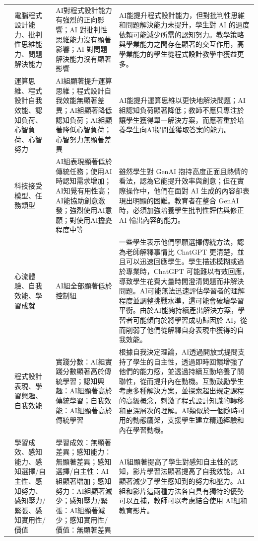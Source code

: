 \begin{longtable}{@{}p{} p{} p{} p{}@{}}
\cite{omeh2025pbl} & 電腦程式設計能力、批判性思維能力、問題解決能力 & AI對程式設計能力有強烈的正向影響；AI 對批判性思維能力沒有顯著影響；AI 對問題解決能力沒有顯著影響 & AI能提升程式設計能力，但對批判性思維和問題解決能力未提升，學生對 AI 的過度依賴可能減少所需的認知努力。教學策略與學業能力之間存在顯著的交互作用，高學業能力的學生從程式設計教學中獲益更多。 \\
\cite{yan2025llm} & 運算思維、程式設計自我效能、認知負荷、心智負荷、心智努力 & AI組顯著提升運算思維；程式設計自我效能無顯著差異；AI組顯著降低認知負荷；AI組顯著降低心智負荷；心智努力無顯著差異 & AI能提升運算思維以更快地解決問題；AI組認知負荷顯著降低；教師不應只專注於讓學生獲得單一解決方案，而應著重於培養學生向AI提問並獲取答案的能力。 \\
\cite{kohen2025integrating} & 科技接受模型、任務類型 & AI組表現顯著低於傳統任務；使用AI時認知需求增加；AI知覺有用性高；AI能協助創意激發；強烈使用AI意願；對使用AI擔憂程度中等 & 雖然學生對 GenAI 抱持高度正面且熱情的看法，認為它能提升效率與創意；但在實際操作中，他們在面對 AI 生成的內容卻表現出明顯的困難。教育者在整合 GenAI 時，必須加強培養學生批判性評估與修正 AI 輸出內容的能力。 \\
\cite{yang2025chatgpt} & 心流體驗、自我效能、學習成就 & AI組全部顯著低於控制組 & 一些學生表示他們寧願選擇傳統方法，認為老師解釋事情比 ChatGPT 更清楚，並且可以迅速回應學生。學生描述模糊或過於專業時，ChatGPT 可能難以有效回應，導致學生花費大量時間澄清問題而非解決問題。AI可能無法迅速評估學習者的理解程度並調整挑戰水準，這可能會破壞學習平衡。由於AI能夠持續產出解決方案，學習者可能傾向於將學習成功歸因於 AI，從而削弱了他們從解釋自身表現中獲得的自我效能。 \\
\cite{tang2025enhancing} & 程式設計表現、學習興趣、自我效能 & 實踐分數：AI組實踐分數顯著高於傳統學習；認知興趣：AI組顯著高於傳統學習；自我效能：AI組顯著高於傳統學習 & 根據自我決定理論，AI透過開放式提問支持了學生的自主性，透過即時回饋增強了他們的能力感，並透過持續互動培養了關聯性，從而提升內在動機。互動鼓勵學生考慮多種解決方案，並探索超出規定課程的高級概念，刺激了程式設計知識的轉移和更深層次的理解。AI類似於一個隨時可用的動態鷹架，支援學生建立精通經驗和內在學習動機。 \\
\cite{cubillos2025generative} & 學習成效、感知能力、感知選擇/自主性、感知努力、感知壓力/緊張、感知實用性/價值 & 學習成效：無顯著差異；感知能力：無顯著差異；感知選擇/自主性：AI組顯著增加；感知努力：AI組顯著減少；感知壓力/緊張：AI組顯著減少；感知實用性/價值：無顯著差異 & AI組顯著提高了學生對感知自主性的認知，影片學習法顯著提高了自我效能，AI顯著減少了學生感知到的努力和壓力。AI組和影片這兩種方法各自具有獨特的優勢可以互補，教師可以考慮結合使用 AI組和教育影片。 \\
\end{longtable}
\endgroup

